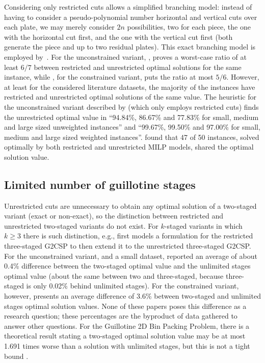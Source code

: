 \documentclass[ppgc,prop-tese,english,formais,babel]{iiufrgs}
\begin{document}
Considering only restricted cuts allows a simplified branching model: instead of having to consider a pseudo-polynomial number horizontal and vertical cuts over each plate, we may merely consider \(2n\) possibilities, two for each piece, the one with the horizontal cut first, and the one with the vertical cut first (both generate the piece and up to two residual plates).
This exact branching model is employed by~\citet{silva:2010}.
For the unconstrained variant, \citet{song:2010}, proves a worst-case ratio of at least \(6/7\) between restricted and unrestricted optimal solutions for the same instance, while \citet{furini:2016}, for the constrained variant, puts the ratio  at most \(5/6\).
However, at least for the considered literature datasets, the majority of the instances have restricted and unrestricted optimal solutions of the same value.
The heuristic for the unconstrained variant described by \citet{song:2010} (which only employs restricted cuts) finds the unrestricted optimal value in ``94.84\%, 86.67\% and 77.83\% for small, medium and large sized unweighted instances'' and ``99.67\%, 99.50\% and 97.00\% for small, medium and large sized weighted instances''.
\citet{furini:2016} found that 47 of 50 instances, solved optimally by both restricted and unrestricted MILP models, shared the optimal solution value.

\subsection{Limited number of guillotine stages}

Unrestricted cuts are unnecessary to obtain any optimal solution of a two-staged variant (exact or non-exact), so the distinction between restricted and unrestricted two-staged variants do not exist.
For \(k\)-staged variants in which~\(k \geq 3\) there is such distinction, e.g., \citet{puchinger:2007} first models a formulation for the restricted three-staged G2CSP to then extend it to the unrestricted three-staged G2CSP.
For the unconstrained variant, and a small dataset, \citet{beasley:1985:guillotine} reported an average of about 0.4\% difference between the two-staged optimal value and the unlimited stages optimal value (about the same between two and three-staged, because three-staged is only 0.02\% behind unlimited stages).
For the constrained variant, however, \citet{martin:2020:models} presents an average difference of 3.6\% between two-staged and unlimited stages optimal solution values.
None of these papers poses this difference as a research question; these percentages are the byproduct of data gathered to answer other questions.
For the Guillotine 2D Bin Packing Problem, there is a theoretical result stating a two-staged optimal solution value may be at most 1.691 times worse than a solution with unlimited stages, but this is not a tight bound \citep{bansal:2005}.
\end{document}

